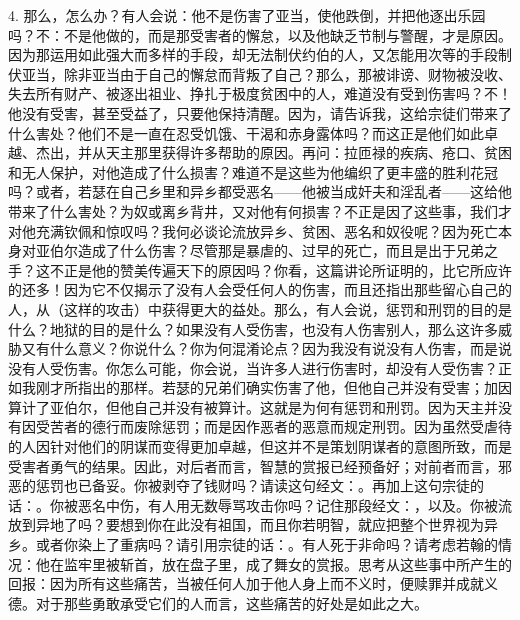 4. 那么，怎么办？有人会说：他不是伤害了亚当，使他跌倒，并把他逐出乐园吗？不：不是他做的，而是那受害者的懈怠，以及他缺乏节制与警醒，才是原因。因为那运用如此强大而多样的手段，却无法制伏约伯的人，又怎能用次等的手段制伏亚当，除非亚当由于自己的懈怠而背叛了自己？那么，那被诽谤、财物被没收、失去所有财产、被逐出祖业、挣扎于极度贫困中的人，难道没有受到伤害吗？不！他没有受害，甚至受益了，只要他保持清醒。因为，请告诉我，这给宗徒们带来了什么害处？他们不是一直在忍受饥饿、干渴和赤身露体吗？而这正是他们如此卓越、杰出，并从天主那里获得许多帮助的原因。再问：拉匝禄的疾病、疮口、贫困和无人保护，对他造成了什么损害？难道不是这些为他编织了更丰盛的胜利花冠吗？或者，若瑟在自己乡里和异乡都受恶名——他被当成奸夫和淫乱者——这给他带来了什么害处？为奴或离乡背井，又对他有何损害？不正是因了这些事，我们才对他充满钦佩和惊叹吗？我何必谈论流放异乡、贫困、恶名和奴役呢？因为死亡本身对亚伯尔造成了什么伤害？尽管那是暴虐的、过早的死亡，而且是出于兄弟之手？这不正是他的赞美传遍天下的原因吗？你看，这篇讲论所证明的，比它所应许的还多！因为它不仅揭示了没有人会受任何人的伤害，而且还指出那些留心自己的人，从（这样的攻击）中获得更大的益处。那么，有人会说，惩罚和刑罚的目的是什么？地狱的目的是什么？如果没有人受伤害，也没有人伤害别人，那么这许多威胁又有什么意义？你说什么？你为何混淆论点？因为我没有说没有人伤害，而是说没有人受伤害。你怎么可能，你会说，当许多人进行伤害时，却没有人受伤害？正如我刚才所指出的那样。若瑟的兄弟们确实伤害了他，但他自己并没有受害；加因算计了亚伯尔，但他自己并没有被算计。这就是为何有惩罚和刑罚。因为天主并没有因受苦者的德行而废除惩罚；而是因作恶者的恶意而规定刑罚。因为虽然受虐待的人因针对他们的阴谋而变得更加卓越，但这并不是策划阴谋者的意图所致，而是受害者勇气的结果。因此，对后者而言，智慧的赏报已经预备好；对前者而言，邪恶的惩罚也已备妥。你被剥夺了钱财吗？请读这句经文：。再加上这句宗徒的话：。你被恶名中伤，有人用无数辱骂攻击你吗？记住那段经文：，以及。你被流放到异地了吗？要想到你在此没有祖国，而且你若明智，就应把整个世界视为异乡。或者你染上了重病吗？请引用宗徒的话：。有人死于非命吗？请考虑若翰的情况：他在监牢里被斩首，放在盘子里，成了舞女的赏报。思考从这些事中所产生的回报：因为所有这些痛苦，当被任何人加于他人身上而不义时，便赎罪并成就义德。对于那些勇敢承受它们的人而言，这些痛苦的好处是如此之大。\par

